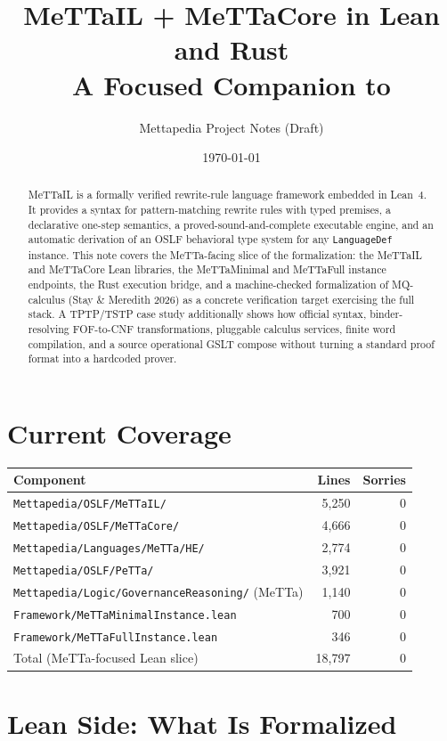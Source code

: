 \documentclass[11pt]{article}
\title{MeTTaIL + MeTTaCore in Lean and Rust\\
\large A Focused Companion to \code{leanOSLF.tex}}
\author{Mettapedia Project Notes (Draft)}
\date{\today}
\newcommand{\code}[1]{\texttt{#1}}
\begin{document}
\maketitle

\begin{abstract}
MeTTaIL is a formally verified rewrite-rule language framework embedded in Lean~4.
It provides a syntax for pattern-matching rewrite rules with typed premises, a
declarative one-step semantics, a proved-sound-and-complete executable engine,
and an automatic derivation of an OSLF behavioral type system for any
\code{LanguageDef} instance.  This note covers the MeTTa-facing slice of the
formalization: the MeTTaIL and MeTTaCore Lean libraries, the MeTTaMinimal and
MeTTaFull instance endpoints, the Rust execution bridge, and a machine-checked
formalization of MQ-calculus (Stay \& Meredith 2026) as a concrete verification
target exercising the full stack.  A TPTP/TSTP case study additionally shows
how official syntax, binder-resolving FOF-to-CNF transformations, pluggable
calculus services, finite word compilation, and a source operational GSLT
compose without turning a standard proof format into a hardcoded prover.
\end{abstract}

\section{Current Coverage}

\begin{longtable}{lrr}
\toprule
Component & Lines & Sorries \\
\midrule
\endhead
\code{Mettapedia/OSLF/MeTTaIL/} & 5,250 & 0 \\
\code{Mettapedia/OSLF/MeTTaCore/} & 4,666 & 0 \\
\code{Mettapedia/Languages/MeTTa/HE/} & 2,774 & 0 \\
\code{Mettapedia/OSLF/PeTTa/} & 3,921 & 0 \\
\code{Mettapedia/Logic/GovernanceReasoning/} (MeTTa) & 1,140 & 0 \\
\code{Framework/MeTTaMinimalInstance.lean} & 700 & 0 \\
\code{Framework/MeTTaFullInstance.lean} & 346 & 0 \\
\midrule
Total (MeTTa-focused Lean slice) & 18,797 & 0 \\
\bottomrule
\end{longtable}

\section{Lean Side: What Is Formalized}
\end{document}
